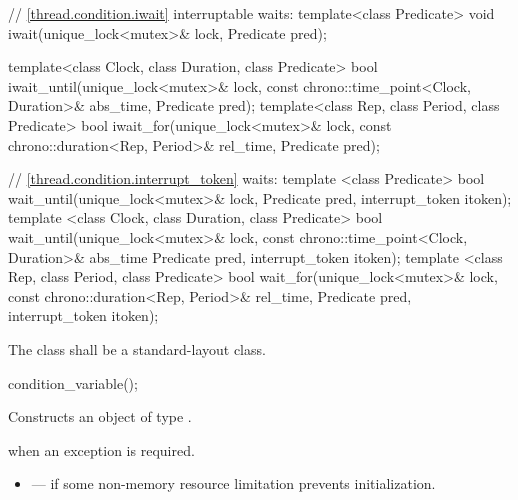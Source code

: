 {\color{insertcolor}
\begin{codeblock}
    // \ref{thread.condition.iwait} interruptable waits:
    template<class Predicate>
      void iwait(unique_lock<mutex>& lock, Predicate pred);

    template<class Clock, class Duration, class Predicate>
      bool iwait_until(unique_lock<mutex>& lock,
                       const chrono::time_point<Clock, Duration>& abs_time,
                       Predicate pred);
    template<class Rep, class Period, class Predicate>
      bool iwait_for(unique_lock<mutex>& lock,
                     const chrono::duration<Rep, Period>& rel_time,
                     Predicate pred);

    // \ref{thread.condition.interrupt_token}  waits:
    template <class Predicate>
      bool wait_until(unique_lock<mutex>& lock,
                      Predicate pred,
                      interrupt_token itoken);
    template <class Clock, class Duration, class Predicate>
      bool wait_until(unique_lock<mutex>& lock,
                      const chrono::time_point<Clock, Duration>& abs_time
                      Predicate pred,
                      interrupt_token itoken);
    template <class Rep, class Period, class Predicate>
      bool wait_for(unique_lock<mutex>& lock,
                    const chrono::duration<Rep, Period>& rel_time,
                    Predicate pred,
                    interrupt_token itoken);
\end{codeblock}
}
\begin{codeblock}
    using native_handle_type = @\impdefnc@;          // see~\ref{thread.req.native}
    native_handle_type native_handle();                         // see~\ref{thread.req.native}
  };
}
\end{codeblock}


\pnum
The class  shall be a standard-layout class.

%
\begin{itemdecl}
condition_variable();
\end{itemdecl}

\begin{itemdescr}
\pnum
\effects Constructs an object of type .

\pnum
\throws {} when an exception is required.

\pnum
\errors
\begin{itemize}
\item {} --- if some non-memory resource
limitation prevents initialization.
\end{itemize}
\end{itemdescr}

